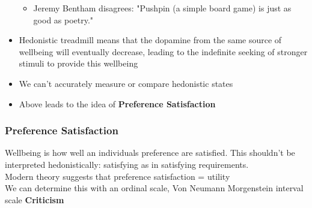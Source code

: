 \documentclass{article}
\begin{document}
\begin{itemize}
\begin{itemize}
                \item Jeremy Bentham disagrees: "Pushpin (a simple board game) is just as good as poetry."
            \end{itemize}{}
            \item Hedonistic treadmill means that the dopamine from the same source of wellbeing will eventually decrease, leading to the indefinite seeking of stronger stimuli to provide this wellbeing
            \item We can't accurately measure or compare hedonistic states
            \item Above leads to the idea of \textbf{Preference Satisfaction}
        \end{itemize}{}


        \subsubsection{Preference Satisfaction}
        Wellbeing is how well an individuals preference are satisfied. This shouldn't be interpreted hedonistically: satisfying as in satisfying requirements.
        \\Modern theory suggests that preference satisfaction = utility
        \\We can determine this with an ordinal scale, Von Neumann Morgenstein interval scale
        \bigbreak
        \textbf{Criticism}
\end{document}
